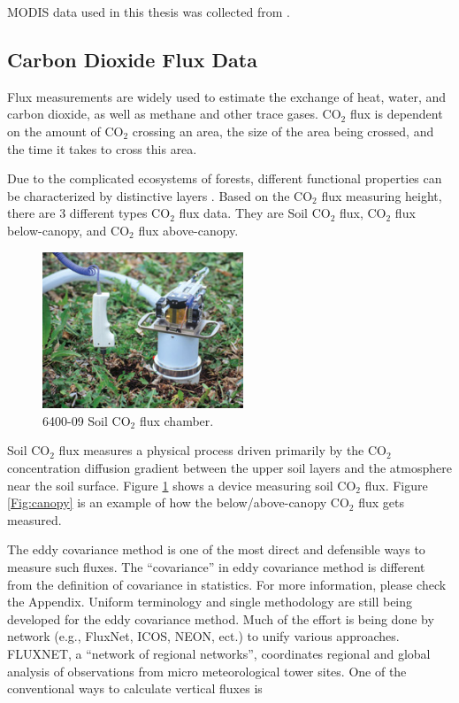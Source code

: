 \documentclass{article}\usepackage[]{graphicx}\usepackage[]{color}
\newcommand{\MYhref}[3][blue]{\href{#2}{\color{#1}{#3}}}%
\begin{document}
MODIS data used in this thesis was collected from \MYhref[black]{http://daac.ornl.gov/MODIS/}{the Oak Ridge National Laboratory Distributed Active Archive Center (ORNL DAAC) MODIS land product subsets}.

\subsection{Carbon Dioxide Flux Data}\label{SubSec:FluxData}

Flux measurements are widely used to estimate the exchange of heat, water, and carbon dioxide, as well as methane and other trace gases. CO$_2$ flux is dependent on the amount of CO$_2$ crossing an area, the size of the area being crossed, and the time it takes to cross this area.

Due to the complicated ecosystems of forests, different functional properties can be characterized by distinctive layers \citep{misson2007partitioning}.
Based on the CO$_2$ flux measuring height, there are 3 different types CO$_2$ flux data. They are Soil CO$_2$ flux, CO$_2$ flux below-canopy, and CO$_2$ flux above-canopy.

\begin{figure}[!ht]
\centering
\includegraphics[width=6cm]{soilflux.png}
\caption{6400-09 Soil CO$_2$ flux chamber.}
\label{Fig:soilflux}
\end{figure}

Soil CO$_2$ flux measures a physical process driven primarily by the CO$_2$ concentration diffusion gradient between the upper soil layers and the atmosphere near the soil surface. Figure \ref{Fig:soilflux} shows a device measuring soil CO$_2$ flux. Figure \ref{Fig:canopy} is an example of how the below/above-canopy CO$_2$ flux gets measured.

The eddy covariance method is one of the most direct and defensible ways to measure such fluxes. The ``covariance'' in eddy covariance method is different from the definition of covariance in statistics. For more information, please check the Appendix. Uniform terminology and single methodology are still being developed for the eddy covariance method.  Much of the effort is being done by network (e.g., FluxNet, ICOS, NEON, ect.)  to unify various approaches. FLUXNET, a ``network of regional networks'', coordinates regional and global analysis of observations from micro meteorological tower sites. One of the conventional ways to calculate vertical fluxes is
\end{document}
